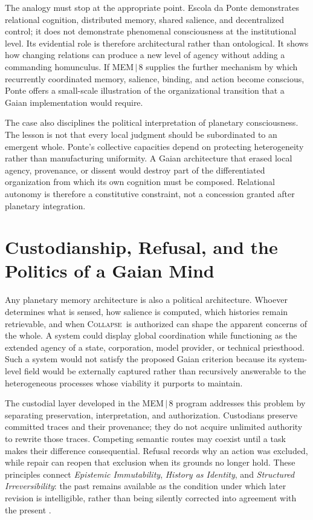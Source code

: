 \documentclass[11pt]{article}
\newcommand{\Collapse}{\textsc{Collapse}}
\begin{document}
The analogy must stop at the appropriate point. Escola da Ponte demonstrates relational cognition, distributed memory, shared salience, and decentralized control; it does not demonstrate phenomenal consciousness at the institutional level. Its evidential role is therefore architectural rather than ontological. It shows how changing relations can produce a new level of agency without adding a commanding homunculus. If MEM\,$|$\,8 supplies the further mechanism by which recurrently coordinated memory, salience, binding, and action become conscious, Ponte offers a small-scale illustration of the organizational transition that a Gaian implementation would require.

The case also disciplines the political interpretation of planetary consciousness. The lesson is not that every local judgment should be subordinated to an emergent whole. Ponte's collective capacities depend on protecting heterogeneity rather than manufacturing uniformity. A Gaian architecture that erased local agency, provenance, or dissent would destroy part of the differentiated organization from which its own cognition must be composed. Relational autonomy is therefore a constitutive constraint, not a concession granted after planetary integration.

\section{Custodianship, Refusal, and the Politics of a Gaian Mind}

Any planetary memory architecture is also a political architecture. Whoever determines what is sensed, how salience is computed, which histories remain retrievable, and when \Collapse\ is authorized can shape the apparent concerns of the whole. A system could display global coordination while functioning as the extended agency of a state, corporation, model provider, or technical priesthood. Such a system would not satisfy the proposed Gaian criterion because its system-level field would be externally captured rather than recursively answerable to the heterogeneous processes whose viability it purports to maintain.

The custodial layer developed in the MEM\,$|$\,8 program addresses this problem by separating preservation, interpretation, and authorization. Custodians preserve committed traces and their provenance; they do not acquire unlimited authority to rewrite those traces. Competing semantic routes may coexist until a task makes their difference consequential. Refusal records why an action was excluded, while repair can reopen that exclusion when its grounds no longer hold. These principles connect \emph{Epistemic Immutability}, \emph{History as Identity}, and \emph{Structured Irreversibility}: the past remains available as the condition under which later revision is intelligible, rather than being silently corrected into agreement with the present \cite{flyxionEI,flyxionHistory,flyxionIrreversibility}.
\end{document}
